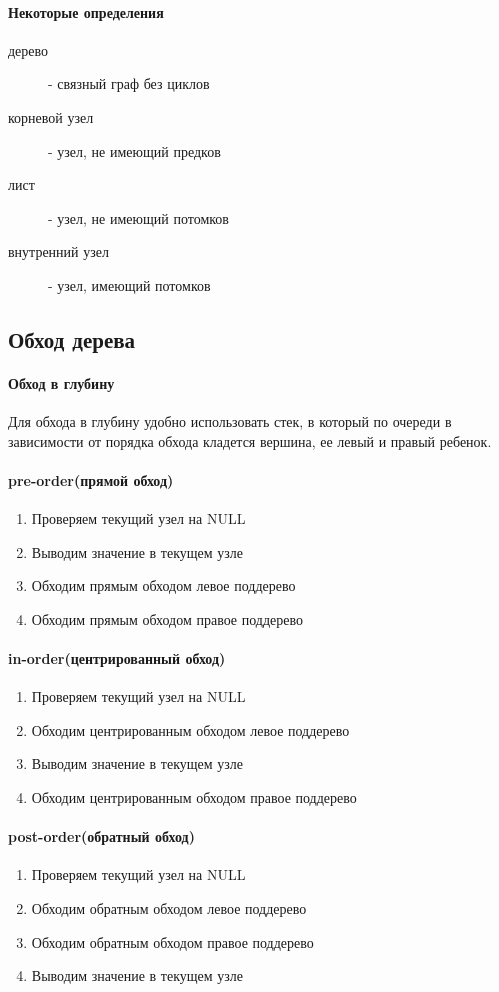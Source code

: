 \documentclass[a4paper,10pt]{article}
\begin{document}
\paragraph{Некоторые определения}
\begin{description}
	\item[дерево] - связный граф без циклов
	\item[корневой узел] - узел, не имеющий предков
	\item[лист] - узел, не имеющий потомков
	\item[внутренний узел] - узел, имеющий потомков
\end{description}
	\subsection{Обход дерева}
\paragraph{Обход в глубину} Для обхода в глубину удобно использовать стек, в который по очереди в зависимости от порядка обхода кладется вершина, ее левый и правый ребенок. 
\paragraph{pre-order(прямой обход)}
\begin{enumerate}
	\item  Проверяем текущий узел на NULL
	\item  Выводим значение в текущем узле
	\item  Обходим прямым обходом левое поддерево
	\item  Обходим прямым обходом правое поддерево
\end{enumerate}

\paragraph{in-order(центрированный обход)}
\begin{enumerate}
	\item  Проверяем текущий узел на NULL
	\item  Обходим центрированным обходом левое поддерево
	\item  Выводим значение в текущем узле
	\item  Обходим центрированным обходом правое поддерево
\end{enumerate}

\paragraph{post-order(обратный обход)}
\begin{enumerate}
	\item  Проверяем текущий узел на NULL
	\item  Обходим обратным обходом левое поддерево
	\item  Обходим обратным обходом правое поддерево
	\item  Выводим значение в текущем узле
\end{enumerate}
\end{document}
